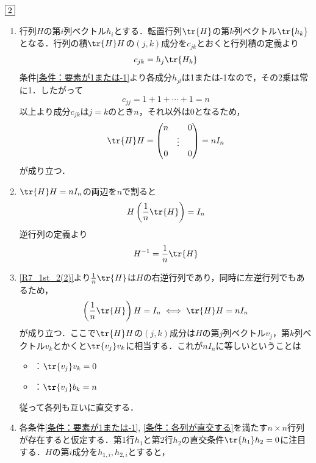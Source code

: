 \begin{souanswer} %
	$\fbox{2}$
\begin{enumerate}
	\item\label{R7_1st_2(2)} 行列$H$の第$i$列ベクトル$h_i$とする．転置行列$\tr{H}$の第$k$列ベクトル$\tr{h_k}$となる．行列の積$\tr{H}H$の$(j, k)$成分を$c_{jk}$とおくと行列積の定義より
\begin{equation*}
	c_{jk}= h_j\tr{H_k}
\end{equation*}
	条件\ref{条件：要素が1または-1}より各成分$h_{jl}$は1または-1なので，その2乗は常に1．したがって
\begin{equation*}
	c_{jj}= 1+ 1+ \cdots+ 1= n
\end{equation*}
	以上より成分$c_{jk}$は$j= k$のとき$n$，それ以外は0となるため，
\begin{equation*}
	\tr{H}H= 
\begin{pmatrix}
	n& & 0\\
	& \vdots& \\
	0& & 0
\end{pmatrix}= 
	nI_n
\end{equation*}
	が成り立つ．
	\item $\tr{H}H= nI_n$の両辺を$n$で割ると
\begin{equation*}
	H\left(\frac{1}{n}\tr{H}\right)= I_n
\end{equation*}
	逆行列の定義より
\begin{equation*}
	H^{-1}= \frac{1}{n}\tr{H}
\end{equation*}
	\item \ref{R7_1st_2(2)}より$\frac{1}{n}\tr{H}$は$H$の右逆行列であり，同時に左逆行列でもあるため，
\begin{equation*}
	\left(\frac{1}{n}\tr{H}\right)H= I_n\iff \tr{H}H= nI_n
\end{equation*}
	が成り立つ．ここで$\tr{H}H$の$(j, k)$成分は$H$の第$j$列ベクトル$v_j$，第$k$列ベクトル$v_k$とかくと$\tr{v_j}v_k$に相当する．これが$nI_n$に等しいということは
\begin{itemize}
	\item[$j\ne k$のとき]：$\tr{v_j}v_k= 0$
	\item[$j= k$のとき]：$\tr{v_j}b_k= n$ 
\end{itemize}
	従って各列も互いに直交する．
	\item 各条件\ref{条件：要素が1または-1}, \ref{条件：各列が直交する}を満たす$n\times n$行列が存在すると仮定する．第1行$h_1$と第2行$h_2$の直交条件$\tr{h_1}h_2= 0$に注目する．$H$の第$i$成分を$h_{1, i}, h_{2, i}$とすると，
\begin{equation*}

\end{equation*}
\end{enumerate}
\end{souanswer}
